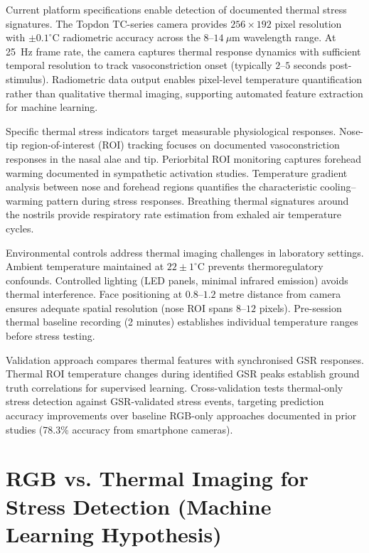 \documentclass{report}
\begin{document}
    Current platform specifications enable detection of documented thermal stress signatures. The Topdon TC-series camera provides $256 \times 192$ pixel resolution with $\pm 0.1^{\circ}$C radiometric accuracy across the $8$--$14~\mu$m wavelength range. At 25~Hz frame rate, the camera captures thermal response dynamics with sufficient temporal resolution to track vasoconstriction onset (typically $2$--$5$ seconds post-stimulus). Radiometric data output enables pixel-level temperature quantification rather than qualitative thermal imaging, supporting automated feature extraction for machine learning.

    Specific thermal stress indicators target measurable physiological responses. Nose-tip region-of-interest (ROI) tracking focuses on documented vasoconstriction responses in the nasal alae and tip. Periorbital ROI monitoring captures forehead warming documented in sympathetic activation studies. Temperature gradient analysis between nose and forehead regions quantifies the characteristic cooling--warming pattern during stress responses. Breathing thermal signatures around the nostrils provide respiratory rate estimation from exhaled air temperature cycles.

    Environmental controls address thermal imaging challenges in laboratory settings. Ambient temperature maintained at $22 \pm 1^{\circ}$C prevents thermoregulatory confounds. Controlled lighting (LED panels, minimal infrared emission) avoids thermal interference. Face positioning at $0.8$--$1.2$ metre distance from camera ensures adequate spatial resolution (nose ROI spans $8$--$12$ pixels). Pre-session thermal baseline recording (2 minutes) establishes individual temperature ranges before stress testing.

    Validation approach compares thermal features with synchronised GSR responses. Thermal ROI temperature changes during identified GSR peaks establish ground truth correlations for supervised learning. Cross-validation tests thermal-only stress detection against GSR-validated stress events, targeting prediction accuracy improvements over baseline RGB-only approaches documented in prior studies (78.3\% accuracy from smartphone cameras).


    \section{RGB vs. Thermal Imaging for Stress Detection (Machine Learning Hypothesis)}
    \label{sec:rgb_vs_thermal}
\end{document}
